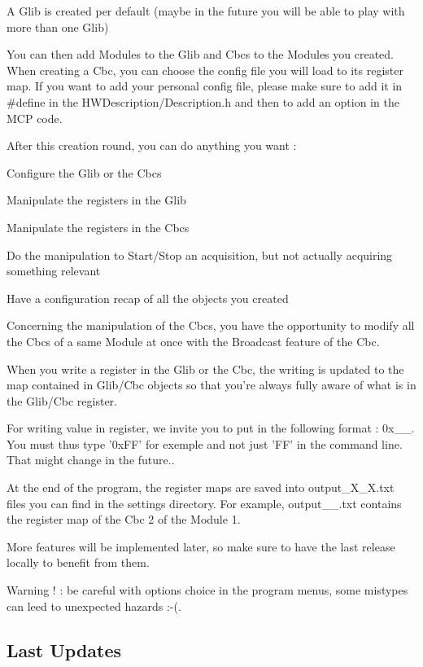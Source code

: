 A Glib is created per default (maybe in the future you will be able to play with more than one Glib)

You can then add Modules to the Glib and Cbcs to the Modules you created. When creating a Cbc, you can choose the config file you will load to its register map. If you want to add your personal config file, please make sure to add it in \#define in the H\-W\-Description/\-Description.\-h and then to add an option in the M\-C\-P code.

After this creation round, you can do anything you want \-:
\begin{DoxyItemize}
\item Configure the Glib or the Cbcs
\item Manipulate the registers in the Glib
\item Manipulate the registers in the Cbcs
\item Do the manipulation to Start/\-Stop an acquisition, but not actually acquiring something relevant
\item Have a configuration recap of all the objects you created
\end{DoxyItemize}

Concerning the manipulation of the Cbcs, you have the opportunity to modify all the Cbcs of a same Module at once with the Broadcast feature of the Cbc.

When you write a register in the Glib or the Cbc, the writing is updated to the map contained in Glib/\-Cbc objects so that you're always fully aware of what is in the Glib/\-Cbc register.

For writing value in register, we invite you to put in the following format \-: 0x\-\_\-\-\_\-. You must thus type '0x\-F\-F' for exemple and not just 'F\-F' in the command line. That might change in the future..

At the end of the program, the register maps are saved into output\-\_\-\-X\-\_\-\-X.\-txt files you can find in the settings directory. For example, output\-\_\-\_.\-txt contains the register map of the Cbc 2 of the Module 1.

More features will be implemented later, so make sure to have the last release locally to benefit from them.

Warning ! \-: be careful with options choice in the program menus, some mistypes can leed to unexpected hazards \-:-\/(.

\subsection*{Last Updates }


